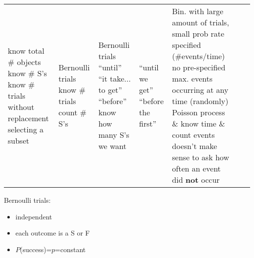 \begin{center}
{\begin{tabular}{ L{2.5cm} | L{3cm} | L{3cm} | L{3cm} | L{3.5cm} | L{3cm} | L{3cm} }
            know total \# objects
            \newline know \# S's
            \newline know \# trials
            \newline without replacement
            \newline selecting a subset
                                                                    &

            Bernoulli trials
            \newline know \# trials
            \newline count \# S's
                                                                    &

            Bernoulli trials
            \newline ``until''
            \newline ``it take... to get''
            \newline ``before''
            \newline know how many S's we want
                                                                    &

            ``until we get''
            \newline ``before the first''
                                                                    &

            Bin. with large amount of trials, small prob
            \newline rate specified (\#events/time)
            \newline no pre-specified max.
            \newline events occurring at any time (randomly)
            \newline Poisson process \& know time \& count events
            \newline doesn't make sense to ask how often
            an event did \textbf{not} occur
        \end{tabular}}
\end{center}

Bernoulli trials:
\begin{itemize}
    \item independent
    \item each outcome is a S or F
    \item $P$(success)=$p$=constant
\end{itemize}